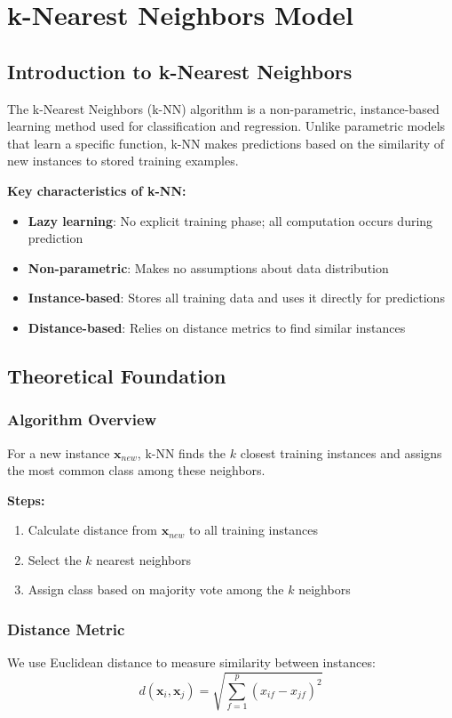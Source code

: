 \section{k-Nearest Neighbors Model}
\label{sec:knn-model}

\subsection{Introduction to k-Nearest Neighbors}
The k-Nearest Neighbors (k-NN) algorithm is a non-parametric, instance-based learning method used for classification and regression. Unlike parametric models that learn a specific function, k-NN makes predictions based on the similarity of new instances to stored training examples.

\textbf{Key characteristics of k-NN:}
\begin{itemize}
    \item \textbf{Lazy learning}: No explicit training phase; all computation occurs during prediction
    \item \textbf{Non-parametric}: Makes no assumptions about data distribution
    \item \textbf{Instance-based}: Stores all training data and uses it directly for predictions
    \item \textbf{Distance-based}: Relies on distance metrics to find similar instances
\end{itemize}

\subsection{Theoretical Foundation}
\subsubsection{Algorithm Overview}
For a new instance $\mathbf{x}_{new}$, k-NN finds the $k$ closest training instances and assigns the most common class among these neighbors.

\textbf{Steps:}
\begin{enumerate}
    \item Calculate distance from $\mathbf{x}_{new}$ to all training instances
    \item Select the $k$ nearest neighbors
    \item Assign class based on majority vote among the $k$ neighbors
\end{enumerate}

\subsubsection{Distance Metric}
We use Euclidean distance to measure similarity between instances:
\begin{equation}
d(\mathbf{x}_i, \mathbf{x}_j) = \sqrt{\sum_{f=1}^{p} (x_{if} - x_{jf})^2}
\end{equation}

